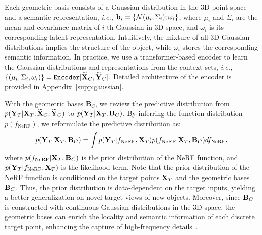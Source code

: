 Each geometric basis consists of a Gaussian distribution in the 3D point space and a semantic representation, \textit{i.e.,} ${\bf{b}}_i = \{ \mathcal{N}(\mu_i, \Sigma_i); \omega_i\}$, 
where $\mu_i$ and $\Sigma_i$ are the mean and covariance matrix of $i$-th Gaussian in 3D space, and $\omega_i$ is its corresponding latent representation. 
Intuitively, the mixture of all 3D Gaussian distributions implies the structure of the object, while $\omega_i$ stores the corresponding semantic information.
In practice, we use a transformer-based encoder to learn the Gaussian distributions and representations from the context sets, \textit{i.e.,} $\{(\mu_i, \Sigma_i, \omega_i)\} = \texttt{Encoder} [{\bf{\widetilde{X}}}_{C}, {\bf{\widetilde{Y}}}_{C}]$. Detailed architecture of the encoder is provided in Appendix~\ref{supp:gaussian}. 



With the geometric bases $\mathbf{B}_C$, we review the predictive distribution from  $p({\bf{Y}}_{T}| {\bf{X}}_{T}, {\bf{\widetilde{X}}}_{C}, {\bf{\widetilde{Y}}}_{C})$ to $p({\bf{Y}}_{T}| {\bf{X}}_{T},{\bf{{B}}}_{C})$.  By inferring the function distribution $p(f_{\text{NeRF}})$, we reformulate the predictive distribution as: 
\begin{equation}
    p({\bf{{Y}}}_{T} | {\bf{{X}}}_{T}, {\bf{{B}}}_{C}) = \int p({\bf{Y}}_{T}|f_{\text{NeRF}}, {\bf{X}}_{T}) p(f_{\text{NeRF}}| {\bf{X}}_{T}, {\bf{B}}_{C}) df_{\text{NeRF}},
\label{eq: predictive_w_B}
\end{equation}
where $p(f_{\text{NeRF}}| {\bf{X}}_{T}, {\bf{B}}_{C})$ is the prior distribution of the NeRF function, and $p({\bf{Y}}_{T}|f_{\text{NeRF}}, {\bf{X}}_{T})$ is the likelihood term. 
Note that the prior distribution of the NeRF function is conditioned on the target points ${\bf{X}}_{T}$ and the geometric bases ${\bf{B}}_{C}$. 
Thus, the prior distribution is data-dependent on the target inputs, yielding a better generalization on novel target views of new objects. 
Moreover, since ${\bf{B}}_{C}$ is constructed with continuous Gaussian distributions in the 3D space, the geometric bases can enrich the locality and semantic information of each discrete target point, enhancing the capture of high-frequency details~\citep{chen2023neurbf,chen2022tensorf,muller2022instant}.



